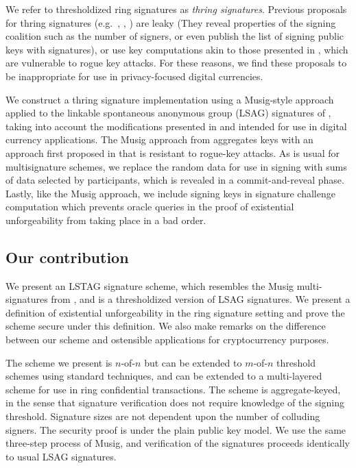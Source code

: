 \documentclass{mrl}
\theoremstyle{definition}
\numberwithin{theorem}{subsection}
\begin{document}
We refer to thresholdized ring signatures as \textit{thring signatures}. Previous proposals for thring signatures (e.g.\ \cite{bresson2002threshold}, \cite{liu2003separable}, \cite{tsang2004separable}) are leaky (They reveal properties of the signing coalition such as the number of signers, or even publish the list of signing public keys with signatures), or use key computations akin to those presented in \cite{bellare2006multi}, which are vulnerable to rogue key attacks. For these reasons, we find these proposals to be inappropriate for use in privacy-focused digital currencies.

We construct a thring signature implementation using a Musig-style approach applied to the linkable spontaneous anonymous group (LSAG) signatures of \cite{liu2004linkable}, taking into account the modifications presented in \cite{backLSAG} and \cite{noether2016ring} intended for use in digital currency applications. The Musig approach from \cite{maxwell2018simple} aggregates keys with an approach first proposed in \cite{qian2010non} that is resistant to rogue-key attacks. As is usual for multisignature schemes, we replace the random data for use in signing with sums of data selected by participants, which is revealed in a commit-and-reveal phase. Lastly, like the Musig approach, we include signing keys in signature challenge computation which prevents oracle queries in the proof of existential unforgeability from taking place in a bad order. 


\subsection{Our contribution}

We present an LSTAG signature scheme, which resembles the Musig multi-signatures from \cite{maxwell2018simple}, and is a thresholdized version of LSAG signatures. We present a definition of existential unforgeability in the ring signature setting and prove the scheme secure under this definition. We also make remarks on the difference between our scheme and ostensible applications for cryptocurrency purposes. 

The scheme we present is $n$-of-$n$ but can be extended to $m$-of-$n$ threshold schemes using standard techniques, and can be extended to a multi-layered scheme for use in ring confidential transactions. The scheme is aggregate-keyed, in the sense that signature verification does not require knowledge of the signing threshold. Signature sizes are not dependent upon the number of colluding signers. The security proof is under the plain public key model. We use the same three-step process of Musig, and verification of the signatures proceeds identically to usual LSAG signatures.
\end{document}

